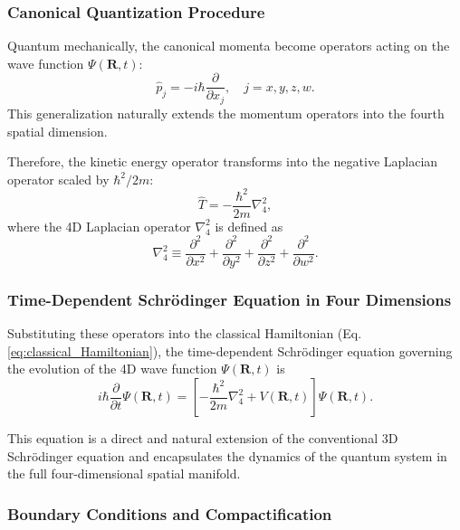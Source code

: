\documentclass[12pt]{article}
\begin{document}
\subsubsection*{Canonical Quantization Procedure}

Quantum mechanically, the canonical momenta become operators acting on the wave function \(\Psi(\mathbf{R}, t)\):
\begin{equation}
    \hat{p}_j = -i \hbar \frac{\partial}{\partial x_j}, \quad j = x, y, z, w.
\end{equation}
This generalization naturally extends the momentum operators into the fourth spatial dimension.

Therefore, the kinetic energy operator transforms into the negative Laplacian operator scaled by \(\hbar^2/2m\):
\begin{equation}
    \hat{T} = - \frac{\hbar^2}{2m} \nabla_4^2,
\end{equation}
where the 4D Laplacian operator \(\nabla_4^2\) is defined as
\begin{equation}
    \nabla_4^2 \equiv \frac{\partial^2}{\partial x^2} + \frac{\partial^2}{\partial y^2} + \frac{\partial^2}{\partial z^2} + \frac{\partial^2}{\partial w^2}.
\end{equation}

\subsubsection*{Time-Dependent Schrödinger Equation in Four Dimensions}

Substituting these operators into the classical Hamiltonian (Eq. \ref{eq:classical_Hamiltonian}), the time-dependent Schrödinger equation governing the evolution of the 4D wave function \(\Psi(\mathbf{R}, t)\) is
\begin{equation}
    i \hbar \frac{\partial}{\partial t} \Psi(\mathbf{R}, t) = \left[-\frac{\hbar^2}{2m} \nabla_4^2 + V(\mathbf{R}, t) \right] \Psi(\mathbf{R}, t).
    \label{eq:4D_Schrodinger_general}
\end{equation}

This equation is a direct and natural extension of the conventional 3D Schrödinger equation and encapsulates the dynamics of the quantum system in the full four-dimensional spatial manifold.

\subsubsection*{Boundary Conditions and Compactification}
\end{document}
